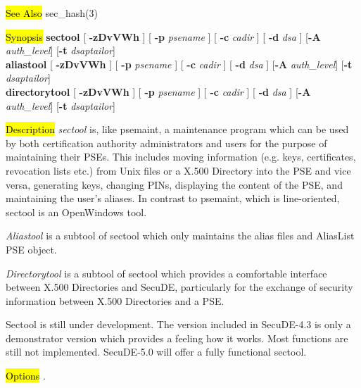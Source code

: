  
\hl{See Also}
sec\_hash(3)

\label{sectool}
\hl{Synopsis}
{\bf sectool} [ {\bf -zDvVWh} ] [ {\bf -p} {\em psename} ] [ {\bf -c} {\em cadir} ] [ {\bf -d} {\em dsa} ] [{\bf -A} {\em auth\_level}] [{\bf -t} {\em dsaptailor}] \\
{\bf aliastool} [ {\bf -zDvVWh} ] [ {\bf -p} {\em psename} ] [ {\bf -c} {\em cadir} ] [ {\bf -d} {\em dsa} ] [{\bf -A} {\em auth\_level}] [{\bf -t} {\em dsaptailor}] \\
{\bf directorytool} [ {\bf -zDvVWh} ] [ {\bf -p} {\em psename} ] [ {\bf -c} {\em cadir} ] [ {\bf -d} {\em dsa} ] [{\bf -A} {\em auth\_level}] [{\bf -t} {\em dsaptailor}] 

\hl{Description}
{\em sectool} is, like psemaint,  a maintenance program which can be used by both
certification authority administrators and users for the purpose
of maintaining their PSEs. This includes moving information (e.g. keys,
certificates, revocation lists etc.) from Unix files or a X.500 Directory
into the PSE and vice versa, generating keys, changing PINs, displaying
the content of the PSE, and maintaining the user's aliases. In contrast
to psemaint, which is line-oriented, sectool is an OpenWindows tool.

{\em Aliastool} is a subtool of sectool which only maintains the alias
files and AliasList PSE object.

{\em Directorytool} is a subtool of sectool which provides a comfortable
interface between X.500 Directories and SecuDE, particularly for the
exchange of security information between X.500 Directories and a PSE.

Sectool is still under development. The version included in SecuDE-4.3
is only a demonstrator version which provides a feeling how it works.
Most functions are still not implemented. SecuDE-5.0 will offer a fully
functional sectool.

\hl{Options}
. 


  
